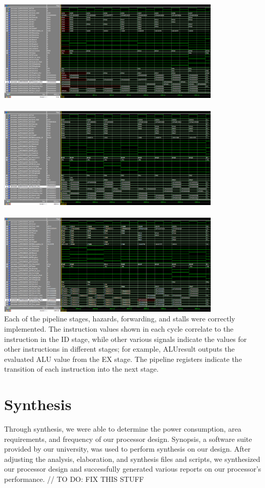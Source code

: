 \documentclass{article}
\begin{document}
\includegraphics[width=0.8\textwidth]{Waveform1.png} \\ \\
\includegraphics[width=0.8\textwidth]{Waveform2.png} \\ \\
\includegraphics[width=0.8\textwidth]{Waveform3.png} \\

Each of the pipeline stages, hazards, forwarding, and stalls were correctly implemented. The instruction values shown in each cycle correlate to the instruction in the ID stage, while other various signals indicate the values for other instructions in different stages; for example, ALUresult outputs the evaluated ALU value from the EX stage. The pipeline registers indicate the transition of each instruction into the next stage.

\section{Synthesis}
Through synthesis, we were able to determine the power consumption, area requirements, and frequency of our processor design. Synopsis, a software suite provided by our university, was used to perform synthesis on our design. After adjusting the analysis, elaboration, and synthesis files and scripts, we synthesized our processor design and successfully generated various reports on our processor's performance. // TO DO: FIX THIS STUFF
\end{document}
